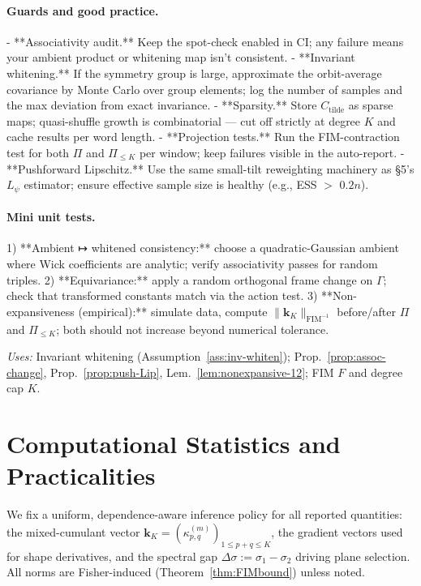 \documentclass[10pt]{article}
\newcommand{\FIM}{\mathrm{FIM}}
\begin{document}
\paragraph{Guards and good practice.}
- **Associativity audit.** Keep the spot-check enabled in CI; any failure means your ambient product or whitening map isn’t consistent.  
- **Invariant whitening.** If the symmetry group is large, approximate the orbit-average covariance by Monte Carlo over group elements; log the number of samples and the max deviation from exact invariance.  
- **Sparsity.** Store \(C_{\text{tilde}}\) as sparse maps; quasi-shuffle growth is combinatorial — cut off strictly at degree \(K\) and cache results per word length.  
- **Projection tests.** Run the FIM-contraction test for both \(\Pi\) and \(\Pi_{\le K}\) per window; keep failures visible in the auto-report.  
- **Pushforward Lipschitz.** Use the same small-tilt reweighting machinery as §5’s \(L_\psi\) estimator; ensure effective sample size is healthy (e.g., ESS \(>\) \(0.2n\)).

\paragraph{Mini unit tests.}
1) **Ambient ↦ whitened consistency:** choose a quadratic-Gaussian ambient where Wick coefficients are analytic; verify associativity passes for random triples.  
2) **Equivariance:** apply a random orthogonal frame change on \(\Gamma\); check that transformed constants match via the action test.  
3) **Non-expansiveness (empirical):** simulate data, compute \(\|\mathbf k_K\|_{\FIM^{-1}}\) before/after \(\Pi\) and \(\Pi_{\le K}\); both should not increase beyond numerical tolerance.

\emph{Uses: } Invariant whitening (Assumption~\ref{ass:inv-whiten}); Prop.~\ref{prop:assoc-change}, Prop.~\ref{prop:push-Lip}, Lem.~\ref{lem:nonexpansive-12}; FIM \(F\) and degree cap \(K\).


\section{Computational Statistics and Practicalities}\label{sec:stats}

We fix a uniform, dependence-aware inference policy for all reported quantities:
the mixed-cumulant vector
$\mathbf k_K=(\kappa^{(m)}_{p,q})_{1\le p+q\le K}$,
the gradient vectors used for shape derivatives,
and the spectral gap $\Delta\sigma:=\sigma_1-\sigma_2$ driving plane selection.
All norms are Fisher-induced (Theorem~\ref{thm:FIMbound}) unless noted.
\end{document}
